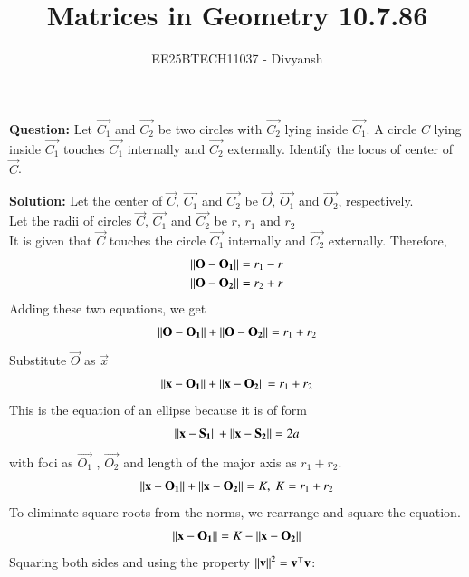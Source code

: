 \documentclass[journal,12pt,onecolumn]{IEEEtran}
\title{Matrices in Geometry 10.7.86}
\author{EE25BTECH11037 - Divyansh}
\theoremstyle{remark}
\begin{document}
\vspace{3cm}
\maketitle
{\let\newpage\relax\maketitle}
\textbf{Question: }
Let $\vec{C_1}$ and $\vec{C_2}$ be two circles with $\vec{C_2}$ lying inside $\vec{C_1}$. A circle $C$ lying inside $\vec{C_1}$ touches $\vec{C_1}$ internally and $\vec{C_2}$ externally. Identify the locus of center of $\vec{C}$.
\vspace{2mm}


\textbf{Solution:}
Let the center of $\vec{C}$, $\vec{C_1}$ and $\vec{C_2}$ be $\vec{O}$, $\vec{O_1}$ and $\vec{O_2}$, respectively.\\
Let the radii of circles $\vec{C}$, $\vec{C_1}$ and $\vec{C_2}$ be $r$, $r_1$ and $r_2$ \\
It is given that $\vec{C}$ touches the circle $\vec{C_1}$ internally and $\vec{C_2}$ externally. Therefore, 
\begin{align}
    \left\lVert\mathbf{O} - \mathbf{O_1}\right\rVert = r_1 - r\\
    \left\lVert\mathbf{O} - \mathbf{O_2}\right\rVert = r_2 + r
\end{align}
Adding these two equations, we get 
\begin{align}
    \left\lVert\mathbf{O} - \mathbf{O_1}\right\rVert + \left\lVert\mathbf{O} - \mathbf{O_2}\right\rVert = r_1 + r_2
\end{align}
Substitute $\vec{O}$ as $\vec{x}$
\begin{align}
    \left\lVert\mathbf{x} - \mathbf{O_1}\right\rVert + \left\lVert\mathbf{x} - \mathbf{O_2}\right\rVert = r_1 + r_2
\end{align}
This is the equation of an ellipse because it is of form 
\begin{align}
    \left\lVert\mathbf{x} - \mathbf{S_1}\right\rVert + \left\lVert\mathbf{x} - \mathbf{S_2}\right\rVert = 2a
\end{align}
with foci  as $\vec{O_1}$ , $\vec{O_2}$ and length of the major axis as $r_1 + r_2$.
\begin{align}
    \norm{\vec{x} - \vec{O_1}} + \norm{\vec{x} - \vec{O_2}} = K, \ K=r_1+r_2
\end{align}
To eliminate square roots from the norms, we rearrange and square the equation.
\begin{align}
 \left\lVert\mathbf{x} - \mathbf{O_1}\right\rVert = K - \left\lVert\mathbf{x} - \mathbf{O_2}\right\rVert
\end{align}
Squaring both sides and using the property $\left\lVert\mathbf{v}\right\rVert^2 = \mathbf{v}^{\top}\mathbf{v}$:
\end{document}
